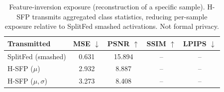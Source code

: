\begin{table}[t]
\centering
\caption{Feature-inversion exposure (reconstruction of a specific sample). H-SFP transmits aggregated class statistics, reducing per-sample exposure relative to SplitFed smashed activations. Not formal privacy.}
\label{tab:inversion}
\begin{tabular}{lcccc}
\toprule
Transmitted & MSE $\downarrow$ & PSNR $\uparrow$ & SSIM $\uparrow$ & LPIPS $\downarrow$ \\
\midrule
SplitFed (smashed) & 0.631 & 15.894 & -- & -- \\
H-SFP ($\mu$) & 2.932 & 8.887 & -- & -- \\
H-SFP ($\mu,\sigma$) & 3.273 & 8.408 & -- & -- \\
\bottomrule
\end{tabular}
\end{table}
